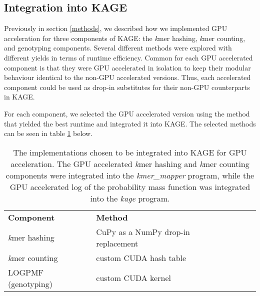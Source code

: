 \subsection{Integration into KAGE} \label{methods:integration_into_kage}
Previously in section \ref{methods}, we described how we implemented GPU acceleration for three components of KAGE: the \textit{k}mer hashing, \textit{k}mer counting, and genotyping components.
Several different methods were explored with different yields in terms of runtime efficiency.
Common for each GPU accelerated component is that they were GPU accelerated in isolation to keep their modular behaviour identical to the non-GPU accelerated versions.
Thus, each accelerated component could be used as drop-in substitutes for their non-GPU counterparts in KAGE.

For each component, we selected the GPU accelerated version using the method that yielded the best runtime and integrated it into KAGE.
The selected methods can be seen in table \ref{methods:integration_into_kage:tables:chosen_methods} below.

\begin{table}[H]
\begin{center}
\begin{tabular}{lllll}
\multicolumn{1}{l|}{\textbf{Component}} & \multicolumn{1}{l}{\textbf{Method}} &  \\ \cline{1-2}
\multicolumn{1}{l|}{\textit{k}mer hashing} & \multicolumn{1}{l}{CuPy as a NumPy drop-in replacement} &  \\
\multicolumn{1}{l|}{\textit{k}mer counting} & \multicolumn{1}{l}{custom CUDA hash table} &  \\
\multicolumn{1}{l|}{LOGPMF (genotyping)} & \multicolumn{1}{l}{custom CUDA kernel} &  \\
\end{tabular}
\end{center}
\caption{
  The implementations chosen to be integrated into KAGE for GPU acceleration.
  The GPU accelerated \textit{k}mer hashing and \textit{k}mer counting components were integrated into the \textit{kmer\_mapper} program, while the GPU accelerated log of the probability mass function was integrated into the \textit{kage} program.
}
\label{methods:integration_into_kage:tables:chosen_methods}
\end{table}

